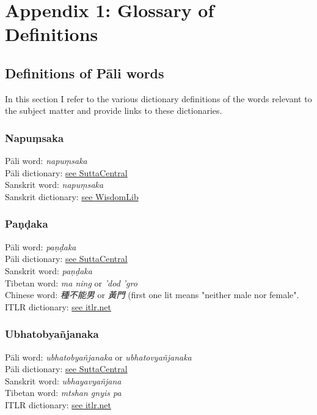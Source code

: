 \section{Appendix 1: Glossary of Definitions}
\label{appendix1}

\subsection{Definitions of Pāli words}
In this section I refer to the various dictionary definitions of the words relevant to the subject matter and provide links to these dictionaries.

\subsubsection{Napuṃsaka}
Pāli word: {\em napuṃsaka} \\
Pāli dictionary: \href{https://suttacentral.net/define/napu%E1%B9%83saka}{see SuttaCentral} \\
Sanskrit word: {\em napuṃsaka} \\
Sanskrit dictionary: \href{https://www.wisdomlib.org/definition/napumsaka}{see WisdomLib} \\

\subsubsection{Paṇḍaka}
Pāli word: {\em paṇḍaka} \\
Pāli dictionary: \href{https://suttacentral.net/define/pa%E1%B9%87%E1%B8%8Daka}{see SuttaCentral} \\
Sanskrit word: {\em paṇḍaka} \\
Tibetan word: {\em ma ning} or {\em ’dod ’gro} \\
Chinese word: {\em 種不能男} or {\em 黃門} (first one lit means "neither male nor female".\\
ITLR dictionary: \href{http://www.itlr.net/hwid:281142}{see itlr.net} \\

\subsubsection{Ubhatob­yañ­janaka}
Pāli word: {\em ubhatob­yañ­janaka} or {\em ubhatovyañ­janaka} \\
Pāli dictionary: \href{https://suttacentral.net/define/ubhatovya%C3%B1janaka}{see SuttaCentral} \\
Sanskrit word: {\em ubhayavyañjana} \\
Tibetan word: {\em mtshan gnyis pa} \\
ITLR dictionary: \href{http://www.itlr.net/hwid:62844}{see itlr.net} \\

